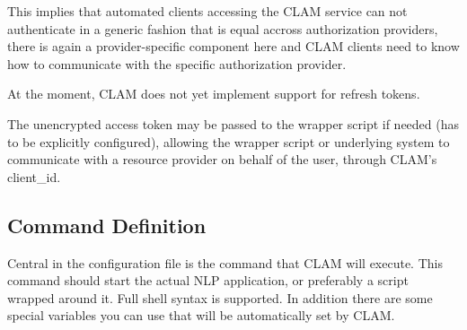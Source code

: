 \documentclass[a4paper,12pt,twoside,openright]{report}
\begin{document}
This implies that automated clients accessing the CLAM service can not
authenticate in a generic fashion that is equal accross authorization
providers, there is again a provider-specific component here and CLAM clients
need to know how to communicate with the specific authorization provider.

At the moment, CLAM does not yet implement support for refresh tokens.

The unencrypted access token may be passed to the wrapper script if needed (has
to be explicitly configured), allowing the wrapper script or underlying system
to communicate with a resource provider on behalf of the user, through CLAM's
client\_id.

\subsection{Command Definition} \label{sec:command}

Central in the configuration file is the command that CLAM will execute. This
command should start the actual NLP application, or preferably a script wrapped
around it. Full shell syntax is supported. In addition there are some special
variables you can use that will be automatically set by CLAM. 
\end{document}
